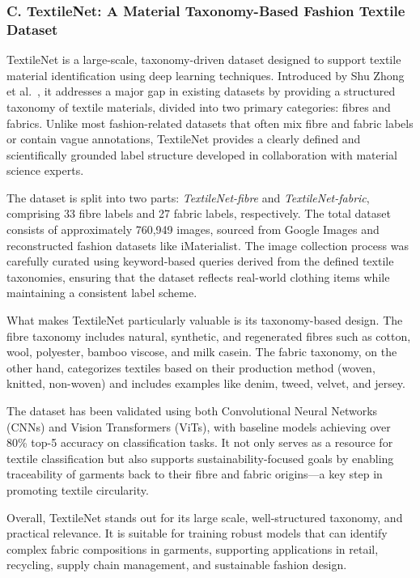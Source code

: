 \subsubsection{C. TextileNet: A Material Taxonomy-Based Fashion Textile Dataset}

TextileNet is a large-scale, taxonomy-driven dataset designed to support textile material identification using deep learning techniques. Introduced by Shu Zhong et al.~\cite{zhong2023textilenet}, it addresses a major gap in existing datasets by providing a structured taxonomy of textile materials, divided into two primary categories: fibres and fabrics. Unlike most fashion-related datasets that often mix fibre and fabric labels or contain vague annotations, TextileNet provides a clearly defined and scientifically grounded label structure developed in collaboration with material science experts.

The dataset is split into two parts: \textit{TextileNet-fibre} and \textit{TextileNet-fabric}, comprising 33 fibre labels and 27 fabric labels, respectively. The total dataset consists of approximately 760,949 images, sourced from Google Images and reconstructed fashion datasets like iMaterialist. The image collection process was carefully curated using keyword-based queries derived from the defined textile taxonomies, ensuring that the dataset reflects real-world clothing items while maintaining a consistent label scheme.

What makes TextileNet particularly valuable is its taxonomy-based design. The fibre taxonomy includes natural, synthetic, and regenerated fibres such as cotton, wool, polyester, bamboo viscose, and milk casein. The fabric taxonomy, on the other hand, categorizes textiles based on their production method (woven, knitted, non-woven) and includes examples like denim, tweed, velvet, and jersey.

The dataset has been validated using both Convolutional Neural Networks (CNNs) and Vision Transformers (ViTs), with baseline models achieving over 80\% top-5 accuracy on classification tasks. It not only serves as a resource for textile classification but also supports sustainability-focused goals by enabling traceability of garments back to their fibre and fabric origins—a key step in promoting textile circularity.

Overall, TextileNet stands out for its large scale, well-structured taxonomy, and practical relevance. It is suitable for training robust models that can identify complex fabric compositions in garments, supporting applications in retail, recycling, supply chain management, and sustainable fashion design.